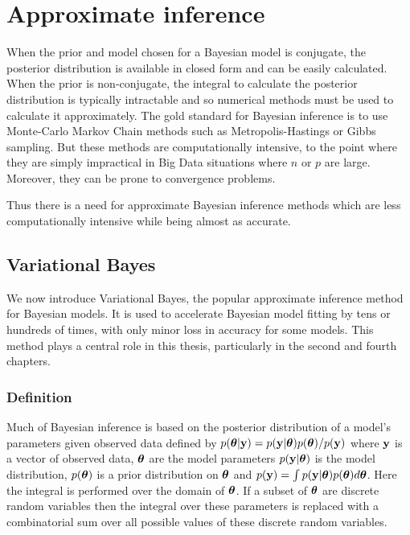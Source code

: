 \section{Approximate inference}
When the prior and model chosen for a Bayesian model is conjugate, the posterior distribution is available in
closed form and can be easily calculated.
When the prior is non-conjugate, the integral to calculate the posterior distribution is typically intractable
and so numerical methods must be used to calculate it approximately.
The gold standard for Bayesian inference is to use Monte-Carlo Markov Chain methods such as Metropolis-Hastings
or Gibbs sampling. But these methods are computationally intensive, to the point where they are simply
impractical in Big Data situations where $n$ or $p$ are large. Moreover, they can be prone to convergence 
problems.

Thus there is a need for approximate Bayesian inference methods which are less computationally intensive while
being almost as accurate.

 
\subsection{Variational Bayes}
\label{sec:vb}

We now introduce Variational Bayes, the popular approximate inference method for Bayesian models. It is used
to accelerate Bayesian model fitting by tens or hundreds of times, with only minor loss in accuracy for some
models. This method plays a central role in this thesis, particularly in the second and fourth chapters.

\subsubsection{Definition}

Much of Bayesian inference is based on the posterior distribution of a model's parameters given observed data 
defined by $p({\boldsymbol \theta}|{\bf y}) = p({\bf y}|{\boldsymbol \theta})p({\boldsymbol \theta})/p({\bf y})$ where ${\bf y}$ is a vector of observed data,
${\boldsymbol \theta}$ are the model parameters $p({\bf y}|{\boldsymbol \theta})$ is the model distribution, $p({\boldsymbol \theta})$ is a prior 
distribution on ${\boldsymbol \theta}$ and $p({\bf y})=\int p({\bf y}|{\boldsymbol \theta})p({\boldsymbol \theta})d{\boldsymbol \theta}$. Here the integral is performed
over the domain of ${\boldsymbol \theta}$. If a subset of ${\boldsymbol \theta}$ are discrete random variables then the integral over
these parameters is replaced with a combinatorial sum over all possible values of these discrete random 
variables.

